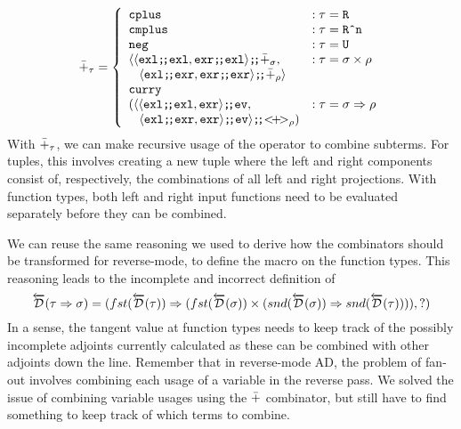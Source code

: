   \begin{align*}
    \synP_\tau =
      \left\{
        \begin{array}{ll}
          \synCplus & : \tau = \synR \\
          \synCmplus & : \tau = \synRn \\
          \synNeg & : \tau = \synUnit \\
          \langle
            \synSeq{\langle \synSeq{\synExl}{\synExl}, \synSeq{\synExr}{\synExl} \rangle}{\synP_\sigma}, & : \tau = \sigma \synStar \rho \\
            \;\;\;\synSeq{\langle \synSeq{\synExl}{\synExr}, \synSeq{\synExr}{\synExr} \rangle}{\synP_\rho} \rangle \\
          \synCurry{ \\
            (\synSeq{\langle
              \synSeq{\langle \synSeq{\synExl}{\synExl}, \synExr \rangle}{\synEv}, & : \tau = \sigma \synFunc \rho \\
              \;\;\;\synSeq{\langle \synSeq{\synExl}{\synExr}, \synExr \rangle}{\synEv} \rangle}{\synPlus_\rho})} \\
        \end{array}
      \right.
  \end{align*}
  With $\bar{+}_\tau$, we can make recursive usage of the operator to combine subterms.
  For tuples, this involves creating a new tuple where the left and right components consist of, respectively, the combinations of all left and right projections.
  With function types, both left and right input functions need to be evaluated separately before they can be combined.

  We can reuse the same reasoning we used to derive how the combinators should be transformed for reverse-mode, to define the macro on the function types.
  This reasoning leads to the incomplete and incorrect definition of
  \begin{equation}
    \overleftarrow{\mathcal{D}}(\tau \Rightarrow \sigma) = (fst(\overleftarrow{\mathcal{D}}(\tau)) \Rightarrow (fst(\overleftarrow{\mathcal{D}}(\sigma)) \times (snd(\overleftarrow{\mathcal{D}}(\sigma)) \Rightarrow snd(\overleftarrow{\mathcal{D}}(\tau)))), ?)
  \end{equation}
  In a sense, the tangent value at function types needs to keep track of the possibly incomplete adjoints currently calculated as these can be combined with other adjoints down the line.
  Remember that in reverse-mode AD, the problem of fan-out involves combining each usage of a variable in the reverse pass.
  We solved the issue of combining variable usages using the $\bar{+}$ combinator, but still have to find something to keep track of which terms to combine.


